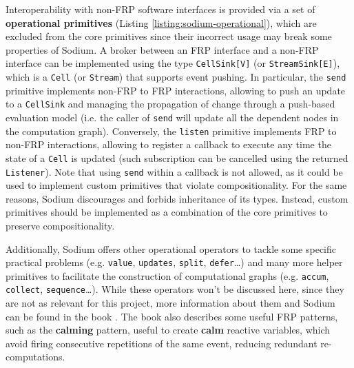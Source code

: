 Interoperability with non-\ac{FRP} software interfaces is provided via a set of
\textbf{operational primitives} (Listing \ref{listing:sodium-operational}),
which are excluded from the core primitives since their incorrect usage may
break some properties of Sodium. A broker between an \ac{FRP} interface and a
non-\ac{FRP} interface can be implemented using the type \texttt{CellSink[V]}
(or \texttt{StreamSink[E]}), which is a \texttt{Cell} (or \texttt{Stream}) that
supports event pushing. In particular, the \texttt{send} primitive implements
non-FRP to FRP interactions, allowing to push an update to a \texttt{CellSink}
and managing the propagation of change through a push-based evaluation model
(i.e. the caller of \texttt{send} will update all the dependent nodes in the
computation graph). Conversely, the \texttt{listen} primitive implements FRP to
non-FRP interactions, allowing to register a callback to execute any time the
state of a \texttt{Cell} is updated (such subscription can be cancelled using
the returned \texttt{Listener}). Note that using \texttt{send} within a
callback is not allowed, as it could be used to implement custom primitives
that violate compositionality. For the same reasons, Sodium discourages and
forbids inheritance of its types. Instead, custom primitives should be
implemented as a combination of the core primitives to preserve
compositionality.



Additionally, Sodium offers other operational operators to tackle some specific
practical problems (e.g. \texttt{value}, \texttt{updates}, \texttt{split},
\texttt{defer}\dots) and many more helper primitives to facilitate the
construction of computational graphs (e.g. \texttt{accum}, \texttt{collect},
\texttt{sequence}\dots). While these operators won't be discussed here, since
they are not as relevant for this project, more information about them and
Sodium can be found in the book \cite{FRP}. The book also describes some useful
\ac{FRP} patterns, such as the \textbf{calming} pattern, useful to create
\textbf{calm} reactive variables, which avoid firing consecutive repetitions of
the same event, reducing redundant re-computations.

